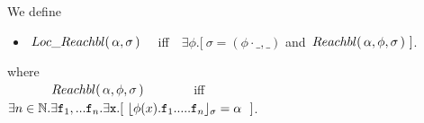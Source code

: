 {\begin{definition} We define 
\begin{itemize}
\item
$ \,Loc\_Reachbl(\,\alpha,\sigma\,) $ \ \ iff\ \  
$\exists \phi.[\ \sigma=(\phi\cdot\_, \_)$ and $\Relevant \alpha \phi \sigma\ ]$. %
\end{itemize}
where\\
$\strut\ \ \ \  \ \ \ \ \ \ \,Reachbl(\,\alpha,\phi,\sigma\,) $  \ \ \ \ \ \ \ iff\ \  
$\exists n\in \mathbb{N}.\exists \prg{f}_1,... \prg{f}_n.\exists \prg{x}.[ \ \interpret{\sigma}{\phi(x).\prg{f}_1.....\prg{f}_n} = \alpha \ \ ]$.

\end{definition}

}
